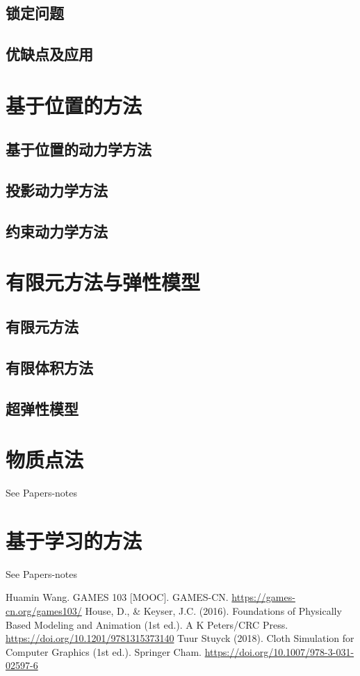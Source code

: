 \documentclass{article}
\begin{document}
\subsection{锁定问题}
\subsection{优缺点及应用}
\section{基于位置的方法}
\subsection{基于位置的动力学方法}
\subsection{投影动力学方法}
\subsection{约束动力学方法}
\section{有限元方法与弹性模型}
\subsection{有限元方法}
\subsection{有限体积方法}
\subsection{超弹性模型}
\section{物质点法}
See Papers-notes
\section{基于学习的方法}
See Papers-notes

\begin{thebibliography}{50}
    Huamin Wang. GAMES 103 [MOOC]. GAMES-CN. \newline \href{https://games-cn.org/games103/}{https://games-cn.org/games103/}
    House, D., \& Keyser, J.C. (2016). Foundations of Physically Based Modeling and Animation (1st ed.). A K Peters/CRC Press. \newline \href{https://doi.org/10.1201/9781315373140}{https://doi.org/10.1201/9781315373140}
    Tuur Stuyck (2018). Cloth Simulation for Computer Graphics (1st ed.). Springer Cham. \newline \href{https://doi.org/10.1007/978-3-031-02597-6}{https://doi.org/10.1007/978-3-031-02597-6}
\end{thebibliography}
\end{document}
